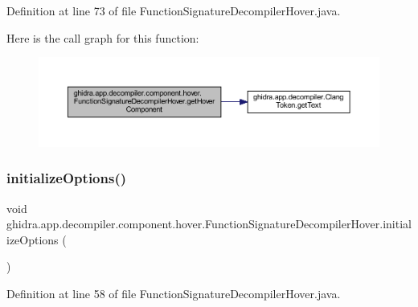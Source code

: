 Definition at line 73 of file Function\+Signature\+Decompiler\+Hover.\+java.

Here is the call graph for this function\+:
\nopagebreak
\begin{figure}[H]
\begin{center}
\leavevmode
\includegraphics[width=350pt]{classghidra_1_1app_1_1decompiler_1_1component_1_1hover_1_1_function_signature_decompiler_hover_ad02afaa8a3143ab0e63231a32ef9629e_cgraph}
\end{center}
\end{figure}
\mbox{\label{classghidra_1_1app_1_1decompiler_1_1component_1_1hover_1_1_function_signature_decompiler_hover_a5acea5a447feb773d46ef4cad16c5cfb}} 
\subsubsection{\texorpdfstring{initializeOptions()}{initializeOptions()}}
{\footnotesize\ttfamily void ghidra.\+app.\+decompiler.\+component.\+hover.\+Function\+Signature\+Decompiler\+Hover.\+initialize\+Options (\begin{DoxyParamCaption}{ }\end{DoxyParamCaption})\hspace{0.3cm}{\ttfamily [inline]}}



Definition at line 58 of file Function\+Signature\+Decompiler\+Hover.\+java.

